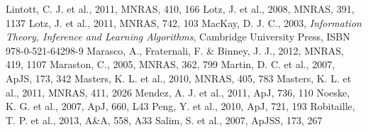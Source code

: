 \documentclass{mn2e}
\begin{document}
\begin{thebibliography}{}
 Lintott, C. J. et al., 2011, MNRAS, 410, 166
 Lotz, J. et al., 2008, MNRAS, 391, 1137
 Lotz, J. et al., 2011, MNRAS, 742, 103
 MacKay, D. J. C., 2003, \emph{Information Theory, Inference and Learning Algorithms}, Cambridge University Press, ISBN 978-0-521-64298-9
 Marasco, A., Fraternali, F. \& Binney, J. J., 2012, MNRAS, 419, 1107
 Maraston, C., 2005, MNRAS, 362, 799
 Martin, D. C. et al., 2007, ApJS, 173, 342
 Masters, K. L. et al., 2010, MNRAS, 405, 783
 Masters, K. L. et al., 2011, MNRAS, 411, 2026
 Mendez, A. J. et al., 2011, ApJ, 736, 110
 Noeske, K. G. et al., 2007, ApJ, 660, L43
 Peng, Y. et al., 2010, ApJ, 721, 193
 Robitaille, T. P. et al., 2013, A\&A, 558, A33
 Salim, S. et al., 2007, ApJSS, 173, 267

\end{thebibliography}
\end{document}
